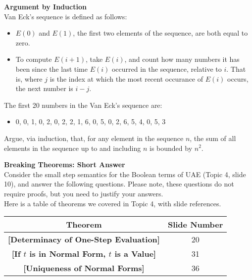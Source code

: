 \documentclass{exam}
\begin{document}
\pagebreak

\begin{questions}
\question[9] \textbf{Argument by Induction} \\ 

Van Eck's sequence is defined as follows:
\begin{itemize}
\item $E(0)$ and $E(1)$, the first two elements of the sequence, are both equal to zero.
\item To compute $E(i + 1)$, take $E(i)$, and count how many numbers it has been since the last time $E(i)$ occurred in the sequence, relative to $i$.  That is, where $j$ is the index at which the most recent occurance of $E(i)$ occurs, the next number is $i - j$.
\end{itemize}

The first 20 numbers in the Van Eck's sequence are:
\begin{itemize}
\item 0, 0, 1, 0, 2, 0, 2, 2, 1, 6, 0, 5, 0, 2, 6, 5, 4, 0, 5, 3
\end{itemize}

Argue, via induction, that, for any element in the sequence $n$, the sum of all elements in the sequence up to and including $n$ is bounded by $n^2$.

\question \textbf{Breaking Theorems: Short Answer} \\ 

Consider the small step semantics for the Boolean terms of UAE (Topic 4, slide 10), and answer the following questions.  Please note, these questions do not require proofs, but you need to justify your answers. \\ 

Here is a table of theorems we covered in Topic 4, with slide references. 

\begin{center}
\begin{tabular}{| c | c |}
\hline
Theorem & Slide Number \\ \hline
\textbf{[Determinacy of One-Step Evaluation]} & 20 \\ \hline
\textbf{[If $t$ is in Normal Form, $t$ is a Value]} & 31 \\ \hline
\textbf{[Uniqueness of Normal Forms]} & 36 \\ \hline
\end{tabular}
\end{center}

\begin{parts}

\end{parts}
\end{questions}
\end{document}

